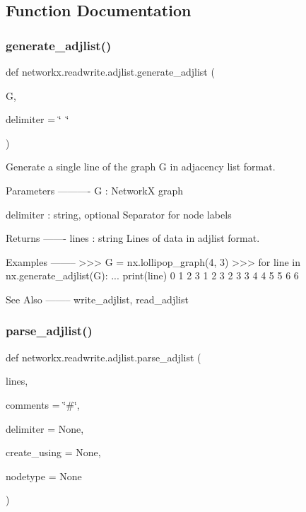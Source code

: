 \subsection{Function Documentation}
\mbox{\label{namespacenetworkx_1_1readwrite_1_1adjlist_ad968491cea6745e67b193d867b43e641}} 
\subsubsection{\texorpdfstring{generate\+\_\+adjlist()}{generate\_adjlist()}}
{\footnotesize\ttfamily def networkx.\+readwrite.\+adjlist.\+generate\+\_\+adjlist (\begin{DoxyParamCaption}\item[{}]{G,  }\item[{}]{delimiter = {\ttfamily \char`\"{}~\char`\"{}} }\end{DoxyParamCaption})}

\begin{DoxyVerb}Generate a single line of the graph G in adjacency list format.

Parameters
----------
G : NetworkX graph

delimiter : string, optional
   Separator for node labels

Returns
-------
lines : string
    Lines of data in adjlist format.

Examples
--------
>>> G = nx.lollipop_graph(4, 3)
>>> for line in nx.generate_adjlist(G):
...     print(line)
0 1 2 3
1 2 3
2 3
3 4
4 5
5 6
6

See Also
--------
write_adjlist, read_adjlist\end{DoxyVerb}
 \mbox{\label{namespacenetworkx_1_1readwrite_1_1adjlist_a888a7fcfbd0047df237d86dbd2bdd36a}} 
\subsubsection{\texorpdfstring{parse\+\_\+adjlist()}{parse\_adjlist()}}
{\footnotesize\ttfamily def networkx.\+readwrite.\+adjlist.\+parse\+\_\+adjlist (\begin{DoxyParamCaption}\item[{}]{lines,  }\item[{}]{comments = {\ttfamily \char`\"{}\#\char`\"{}},  }\item[{}]{delimiter = {\ttfamily None},  }\item[{}]{create\+\_\+using = {\ttfamily None},  }\item[{}]{nodetype = {\ttfamily None} }\end{DoxyParamCaption})}

